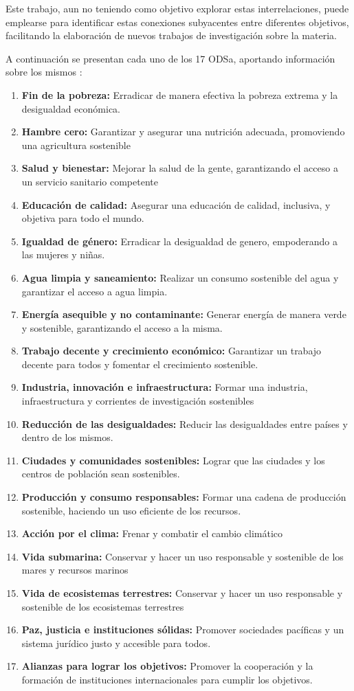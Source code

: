Este trabajo, aun no teniendo como objetivo explorar estas
interrelaciones, puede emplearse para identificar estas conexiones subyacentes
entre diferentes objetivos, facilitando la elaboración de nuevos trabajos de 
investigación sobre la materia. 

A continuación se presentan cada uno de los 17
\gls{ODSa}, aportando información sobre los mismos \cite{UNSDGs}:

\begin{enumerate}
	\item \textbf{Fin de la pobreza:} Erradicar de manera efectiva la pobreza extrema y
	la desigualdad económica.
	\item \textbf{Hambre cero:} Garantizar y asegurar una nutrición adecuada, promoviendo
	una agricultura sostenible
	\item \textbf{Salud y bienestar:} Mejorar la salud de la gente, garantizando el
	acceso a un servicio sanitario competente 
	\item \textbf{Educación de calidad:} Asegurar una educación de calidad, inclusiva, y
	objetiva para todo el mundo.
	\item \textbf{Igualdad de género:} Erradicar la desigualdad de genero, empoderando a
	las mujeres y niñas.
	\item \textbf{Agua limpia y saneamiento:} Realizar un consumo sostenible del agua y
	garantizar el acceso a agua limpia.
	\item \textbf{Energía asequible y no contaminante:} Generar energía de manera verde y
	sostenible, garantizando el acceso a la misma.
	\item \textbf{Trabajo decente y crecimiento económico:} Garantizar un trabajo decente
	para todos y fomentar el crecimiento sostenible.
	\item \textbf{Industria, innovación e infraestructura:} Formar una industria,
	infraestructura y corrientes de investigación sostenibles
	\item \textbf{Reducción de las desigualdades:} Reducir las desigualdades entre países
	y dentro de los mismos.
	\item \textbf{Ciudades y comunidades sostenibles:} Lograr que las ciudades y los
	centros de población sean sostenibles.
	\item \textbf{Producción y consumo responsables:} Formar una cadena de producción
	sostenible, haciendo un uso eficiente de los recursos.
	\item \textbf{Acción por el clima:} Frenar y combatir el cambio climático
	\item \textbf{Vida submarina:} Conservar y hacer un uso responsable y sostenible de
	los mares y recursos marinos
	\item \textbf{Vida de ecosistemas terrestres:} Conservar y hacer un uso responsable y
	sostenible de los ecosistemas terrestres
	\item \textbf{Paz, justicia e instituciones sólidas:} Promover sociedades pacíficas y
	un sistema jurídico justo y accesible para todos.
	\item \textbf{Alianzas para lograr los objetivos:} Promover la cooperación y la
	formación de instituciones internacionales para cumplir los objetivos.
\end{enumerate}

